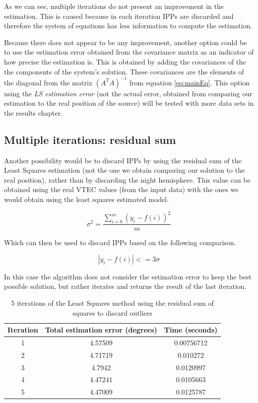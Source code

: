 As we can see, multiple iterations do not present an improvement in the estimation. This is caused because in each iteration IPPs are discarded and therefore the system of equations has less information to compute the estimation.

Because there does not appear to be any improvement, another option could be to use the estimation error obtained from the covariance matrix as an indicator of how precise the estimation is. This is obtained by adding the covariances of the the components of the system's solution. These covariances are the elements of the diagonal from the matrix $(A^{T}A)^{-1}$ from equation \ref{eq:mainEq}. This option using the \textit{LS estimation error} (not the actual error, obtained from comparing our estimation to the real position of the source) will be tested with more data sets in the results chapter.



\subsection{Multiple iterations: residual sum}

Another possibility would be to discard IPPs by using the residual sum of the Least Squares estimation (not the one we obtain comparing our solution to the real position), rather than by discarding the night hemisphere. This value can be obtained using the real VTEC values (from the input data) with the ones we would obtain using the least squares estimated model.

\begin{equation} \label{eq:residual}
\sigma^{2} = \frac{\sum_{i = 0}^{m}(y_{i}-f(i))^{2}}{m}
\end{equation}

Which can then be used to discard IPPs based on the following comparison.

\begin{equation} \label{eq:discard}
|y_{i}-f(i)| <= 3\sigma
\end{equation}

In this case the algorithm does not consider the estimation error to keep the best possible solution, but rather iterates and returns the result of the last iteration.

\begin{table}[h!]
	\centering
	\def\arraystretch{1.2}
	\begin{tabular}{|c c c|} 
		\hline
		Iteration & Total estimation error (degrees) & Time (seconds) \\ [0.5ex] 
		\hline\hline
		1  & 4.57509 & 0.00756712 \\
		\hline
		2  & 4.71719 & 0.010272 \\
		\hline
		3  & 4.7942 & 0.0120997 \\
		\hline
		4  & 4.47241 & 0.0105663 \\
		\hline
		5  & 4.47009 & 0.0125787 \\
		\hline
	\end{tabular}
	\caption{5 iterations of the Least Squares method using the residual sum of squares to discard outliers}
\end{table}

